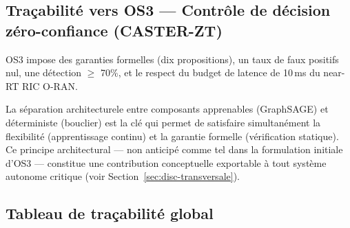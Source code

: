 \subsection{Traçabilité vers OS3 --- Contrôle de décision zéro-confiance (CASTER-ZT)}

OS3 impose des garanties formelles (dix propositions), un taux de faux positifs nul, une détection $\geq$ 70\%, et le respect du budget de latence de 10\,ms du near-RT RIC O-RAN.

\begin{table}[htbp]
\centering
\caption{Traçabilité des résultats CASTER-ZT vers les sous-objectifs OS3.}
\label{tab:tracabilite-os3}
\end{table}

La séparation architecture\-le entre composants apprenables (GraphSAGE) et déterministe (bouclier) est la clé qui permet de satisfaire simultanément la flexibilité (apprentissage continu) et la garantie formelle (vérification statique). Ce principe architectural --- non anticipé comme tel dans la formulation initiale d'OS3 --- constitue une contribution conceptuelle exportable à tout système autonome critique (voir Section~\ref{sec:disc-transversale}).

\subsection{Tableau de traçabilité global}

